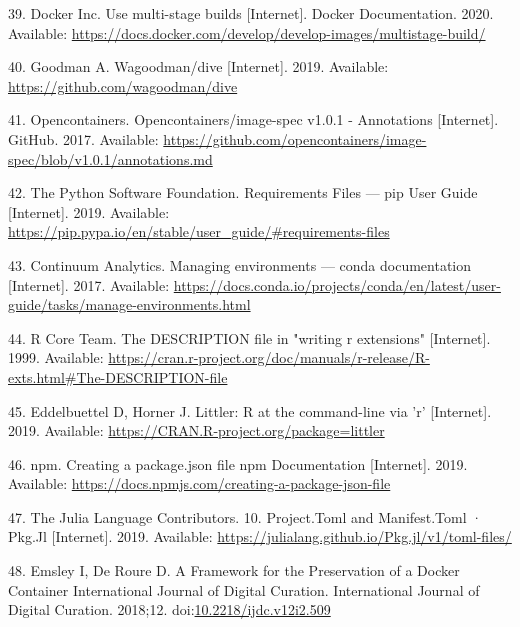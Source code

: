 \documentclass[10pt,letterpaper]{article}
\begin{document}
\leavevmode\hypertarget{ref-docker_multi-stage_2020}{}%
39. Docker Inc. Use multi-stage builds {[}Internet{]}. Docker
Documentation. 2020. Available:
\url{https://docs.docker.com/develop/develop-images/multistage-build/}

\leavevmode\hypertarget{ref-goodman_dive_2019}{}%
40. Goodman A. Wagoodman/dive {[}Internet{]}. 2019. Available:
\url{https://github.com/wagoodman/dive}

\leavevmode\hypertarget{ref-opencontainers_image-spec_2017}{}%
41. Opencontainers. Opencontainers/image-spec v1.0.1 - Annotations
{[}Internet{]}. GitHub. 2017. Available:
\url{https://github.com/opencontainers/image-spec/blob/v1.0.1/annotations.md}

\leavevmode\hypertarget{ref-the_python_software_foundation_requirements_2019}{}%
42. The Python Software Foundation. Requirements Files --- pip User
Guide {[}Internet{]}. 2019. Available:
\url{https://pip.pypa.io/en/stable/user_guide/\#requirements-files}

\leavevmode\hypertarget{ref-continuum_analytics_managing_2017}{}%
43. Continuum Analytics. Managing environments --- conda documentation
{[}Internet{]}. 2017. Available:
\url{https://docs.conda.io/projects/conda/en/latest/user-guide/tasks/manage-environments.html}

\leavevmode\hypertarget{ref-r_core_team_description_1999}{}%
44. R Core Team. The DESCRIPTION file in "writing r extensions"
{[}Internet{]}. 1999. Available:
\url{https://cran.r-project.org/doc/manuals/r-release/R-exts.html\#The-DESCRIPTION-file}

\leavevmode\hypertarget{ref-eddelbuettel_littler_2019}{}%
45. Eddelbuettel D, Horner J. Littler: R at the command-line via 'r'
{[}Internet{]}. 2019. Available:
\url{https://CRAN.R-project.org/package=littler}

\leavevmode\hypertarget{ref-npm_creating_2019}{}%
46. npm. Creating a package.json file npm Documentation {[}Internet{]}.
2019. Available:
\url{https://docs.npmjs.com/creating-a-package-json-file}

\leavevmode\hypertarget{ref-julia_tomls_2019}{}%
47. The Julia Language Contributors. 10. Project.Toml and Manifest.Toml
· Pkg.Jl {[}Internet{]}. 2019. Available:
\url{https://julialang.github.io/Pkg.jl/v1/toml-files/}

\leavevmode\hypertarget{ref-emsley_framework_2018}{}%
48. Emsley I, De Roure D. A Framework for the Preservation of a Docker
Container International Journal of Digital Curation. International
Journal of Digital Curation. 2018;12.
doi:\href{https://doi.org/10.2218/ijdc.v12i2.509}{10.2218/ijdc.v12i2.509}
\end{document}
